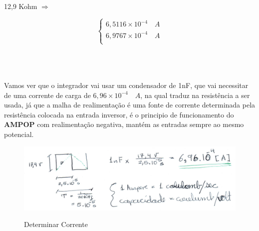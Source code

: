 \documentclass[titlepage, a4paper, 10pt, reqno, openany]{report}
\begin{document}
\hspace{3cm} 12,9 Kohm \qquad $\Longrightarrow$ \hspace{1cm}
\begin{minipage}[l]{0pt}
	$$\left\lbrace\begin{array}{c}
		6,5116 \times 10^{-4} \quad A \\
		6,9767 \times 10^{-4} \quad A \\
	\end{array}\right.$$
\end{minipage}\\
\\
\\
Vamos ver que o integrador vai usar um condensador de 1nF, que vai necessitar de uma corrente de carga de $6,96 \times 10^{-4} \quad A$, na qual traduz na resistência a ser usada, já que a malha de realimentação é uma fonte de corrente determinada pela resistência colocada na entrada inversor, é o principio de funcionamento do {\bf AMPOP} com realimentação negativa, mantém as entradas sempre ao mesmo potencial.
\begin{figure}[H]
	\includegraphics[scale=0.9]{./image/trb3calc_1.jpg}\\
	\caption{Determinar Corrente}
\end{figure}
\end{document}
